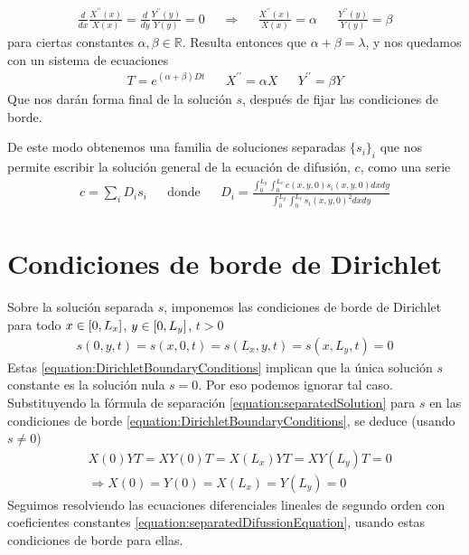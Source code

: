 \documentclass{article}
\newcommand{\realNumbers}{\mathbb{R}}
\newcommand{\leftOpenInterval}{\left]}
\newcommand{\rightOpenInterval}{\right[}
\newcommand{\leftClosedInterval}{\left[}
\newcommand{\rightClosedInterval}{\right]}
\newcommand{\interval}[3]{%
  \ifstrequal{#1}{oo}{%
    \leftOpenInterval #2, #3 \rightOpenInterval%
  }{%
    \ifstrequal{#1}{co}{%
      \leftClosedInterval #2, #3 \rightOpenInterval%
    }{%
      \ifstrequal{#1}{oc}{
        \leftOpenInterval #2, #3 \rightClosedInterval%
      }{%
        \ifstrequal{#1}{cc}{
          \leftClosedInterval #2, #3 \rightClosedInterval
        }{%
        }%
      }%
    }%
  }%
}
\begin{document}
  \begin{align}
    \frac{d}{d x} \frac{X^{\prime\prime}(x)}{X(x)} 
    =
    \frac{d}{d y} \frac{Y^{\prime\prime}(y)}{Y(y)}
    =
    0
    &&\Rightarrow
    &&\frac{X^{\prime\prime}(x)}{X(x)} = \alpha
    &&\frac{Y^{\prime\prime}(y)}{Y(y)} = \beta
  \end{align}
  para ciertas constantes \(\alpha, \beta \in \realNumbers\).
  Resulta entonces que \(\alpha + \beta = \lambda\), y nos quedamos con un sistema de ecuaciones
  \begin{align}
    \label{equation:separatedDifussionEquation}
    T = e^{(\alpha + \beta) D t}
    && X^{\prime\prime} = \alpha X
    && Y^{\prime\prime} = \beta Y
  \end{align}
  Que nos darán forma final de la solución \(s\), después de fijar las condiciones de borde.

  De este modo obtenemos una familia de soluciones separadas \(\{s_i\}_i\) que nos permite escribir la solución general de la ecuación de difusión, \(c\), como una serie
  \begin{align}
    c = \sum_i D_i s_i
    &&\text{donde}
    &&D_i = \frac{\int_0^{L_y}\int_0^{L_x} c(x, y, 0) s_i(x, y, 0) d x d y}{\int_0^{L_y}\int_0^{L_x} s_i(x, y, 0)^2 d x d y}
  \end{align}

  \section{Condiciones de borde de Dirichlet}
  Sobre la solución separada \(s\), imponemos las condiciones de borde de Dirichlet para todo \(x \in \interval{cc}{0}{L_x}\), \(y \in \interval{cc}{0}{L_y}\), \(t > 0\)
  \begin{align}
    \label{equation:DirichletBoundaryConditions}
    s(0, y , t)
    =
    s(x, 0, t)
    =
    s(L_x, y, t)
    =
    s(x, L_y, t)
    =
    0
  \end{align}
  Estas \eqref{equation:DirichletBoundaryConditions} implican que la única solución \(s\) constante es la solución nula \(s = 0\).
  Por eso podemos ignorar tal caso.
  Substituyendo la fórmula de separación \eqref{equation:separatedSolution} para \(s\) en las condiciones de borde \eqref{equation:DirichletBoundaryConditions}, se deduce (usando \(s \neq 0\))
  \begin{align}
    &X(0) Y T
    =
    X Y(0) T
    =
    X(L_x) Y T
    =
    X Y(L_y) T
    =
    0
    \\
    \label{equation:separatedInitialConditions}
    &\Rightarrow X(0) = Y(0) = X(L_x) = Y(L_y) = 0
  \end{align}
  Seguimos resolviendo las ecuaciones diferenciales lineales de segundo orden con coeficientes constantes \eqref{equation:separatedDifussionEquation}, usando estas condiciones de borde para ellas.
  
\end{document}
